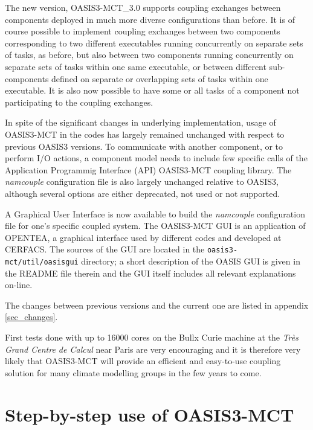 The new version, OASIS3-MCT\_3.0 supports coupling exchanges between
components deployed in much more diverse configurations than
before. It is of course possible to implement coupling exchanges
between two components corresponding to two different executables
running concurrently on separate sets of tasks, as before, but also
between two components running concurrently on separate sets of tasks
within one same executable, or between different
sub-components defined on separate or overlapping sets of tasks within
one executable. It is also now possible to
have some or all tasks of a component not participating to the
coupling exchanges. 

In spite of the significant changes in underlying implementation,
usage of OASIS3-MCT in the codes has largely remained unchanged with
respect to previous OASIS3 versions.
To communicate with another component, or to perform I/O actions, a
component model needs to include few specific calls of the Application Programmig Interface (API)  OASIS3-MCT coupling library.  The {\it namcouple} configuration file is also largely unchanged
relative to OASIS3, although several options are either deprecated, not used
or not supported. 

A Graphical User Interface is now available to build
the {\it namcouple} configuration file for one's specific coupled
system. The OASIS3-MCT GUI is an application of OPENTEA, a graphical
interface used by different codes and developed at CERFACS. The
sources of the GUI are located in the {\tt oasis3-mct/util/oasisgui}
directory; a short description of the OASIS GUI is given in the README
file therein and the GUI itself includes all relevant explanations on-line.

The changes between previous versions and the
current one are listed in appendix \ref{sec_changes}.
 
First tests done with up to
16000 cores on the Bullx Curie machine at the {\it Tr\`es Grand Centre de
Calcul} near Paris are very encouraging
and it is therefore very likely that OASIS3-MCT will provide an efficient and
easy-to-use coupling solution for many climate modelling groups in the few years to come. 


\section{Step-by-step use of OASIS3-MCT}

